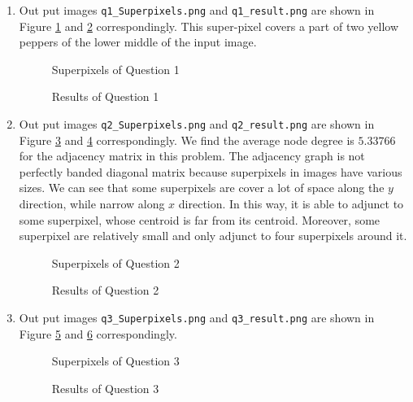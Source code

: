 \documentclass[12pt]{article}
\begin{document}
	\begin{enumerate}
		\item Out put images  \texttt{q1\_Superpixels.png} and \texttt{q1\_result.png} are shown in Figure \ref{fig:q1_1} and \ref{fig:q1_2} correspondingly. This super-pixel covers a part of two yellow peppers of the lower middle of the input image. 
		\begin{figure}[H]
			\centering{}
			\caption{Superpixels of Question 1}
			\label{fig:q1_1}
		\end{figure}
		\begin{figure}[H]
			\centering{}
			\caption{Results of Question 1}
			\label{fig:q1_2}
		\end{figure}
		
		
	\item Out put images  \texttt{q2\_Superpixels.png} and \texttt{q2\_result.png} are shown in Figure \ref{fig:q2_1} and \ref{fig:q2_2} correspondingly. We find the average node degree is $5.33766$ for the adjacency matrix in this problem. The adjacency graph is not perfectly banded diagonal matrix because superpixels in images have various sizes. We can see that some superpixels are cover a lot of space along the $y$ direction, while narrow along $x$ direction. In this way, it is able to adjunct to some superpixel, whose centroid is far from its centroid. Moreover, some superpixel are relatively small and only adjunct to four superpixels around it.  
	\begin{figure}[H]
		\centering{}
		\caption{Superpixels of Question 2}
		\label{fig:q2_1}
	\end{figure}
	\begin{figure}[H]
		\centering{}
		\caption{Results of Question 2}
		\label{fig:q2_2}
	\end{figure}


	\item Out put images  \texttt{q3\_Superpixels.png} and \texttt{q3\_result.png} are shown in Figure \ref{fig:q3_1} and \ref{fig:q3_2} correspondingly.
	\begin{figure}[H]
		\centering{}
		\caption{Superpixels of Question 3}
		\label{fig:q3_1}
	\end{figure}
	\begin{figure}[H]
		\centering{}
		\caption{Results of Question 3}
		\label{fig:q3_2}
	\end{figure}
	\end{enumerate}
\pagebreak
\end{document}
